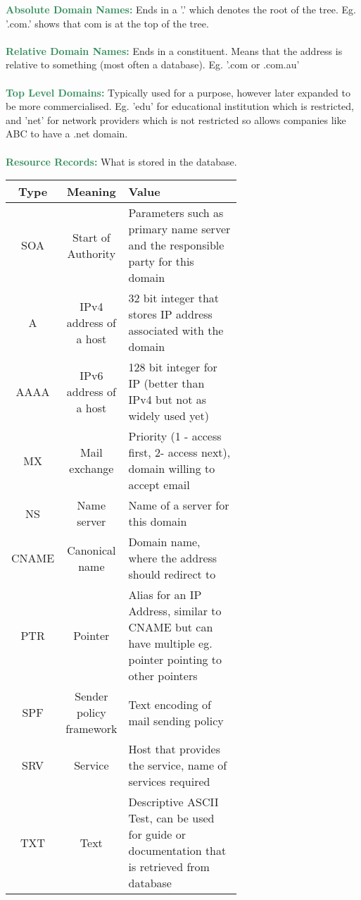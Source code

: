 \documentclass[a4paper,10pt]{article}
\begin{document}
\textcolor{SeaGreen}{\textbf{Absolute Domain Names:}} Ends in a '.' which denotes the root of the tree. Eg. '.com.' shows that com is at the top of the tree. \\\\
\textcolor{SeaGreen}{\textbf{Relative Domain Names:}} Ends in a constituent. Means that the address is relative to something (most often a database). Eg. '.com or .com.au' \\\\ 
\textcolor{SeaGreen}{\textbf{Top Level Domains:}} Typically used for a purpose, however later expanded to be more commercialised. Eg. 'edu' for educational institution which is restricted, and 'net' for network providers which is not restricted so allows companies like ABC to have a .net domain. \\\\
\newpage
\noindent \textcolor{SeaGreen}{\textbf{Resource Records:}} What is stored in the database. 
\begin{center}
	\begin{tabular}{ |c|c|p{0.65\linewidth}| }
		\hline
		\textbf{Type} &\textbf{Meaning} &\textbf{Value} \\
		\hline
		\hline
		SOA &Start of Authority &Parameters such as primary name server and the responsible party for this domain \\
		\hline
		A &IPv4 address of a host &32 bit integer that stores IP address associated with the domain \\ 
		\hline
		AAAA &IPv6 address of a host &128 bit integer for IP (better than IPv4 but not as widely used yet) \\
		\hline
		MX &Mail exchange &Priority (1 - access first, 2- access next), domain willing to accept email \\
		\hline
		NS &Name server &Name of a server for this domain \\ 
		\hline
		CNAME &Canonical name &Domain name, where the address should redirect to \\
		\hline
		PTR &Pointer &Alias for an IP Address, similar to CNAME but can have multiple eg. pointer pointing to other pointers \\ 
		\hline
		SPF &Sender policy framework &Text encoding of mail sending policy \\ 
		\hline
		SRV &Service &Host that provides the service, name of services required \\ 
		\hline
		TXT &Text &Descriptive ASCII Test, can be used for guide or documentation that is retrieved from database \\ 
		\hline		
	\end{tabular}
\end{center}
\end{document}
